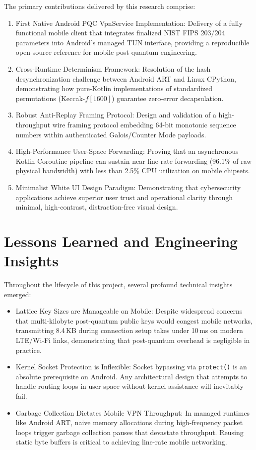 The primary contributions delivered by this research comprise:
\begin{enumerate}
    \item First Native Android PQC VpnService Implementation: Delivery of a fully functional mobile client that integrates finalized NIST FIPS 203/204 parameters into Android's managed TUN interface, providing a reproducible open-source reference for mobile post-quantum engineering.
    \item Cross-Runtime Determinism Framework: Resolution of the hash desynchronization challenge between Android ART and Linux CPython, demonstrating how pure-Kotlin implementations of standardized permutations (Keccak-$f[1600]$) guarantee zero-error decapsulation.
    \item Robust Anti-Replay Framing Protocol: Design and validation of a high-throughput wire framing protocol embedding 64-bit monotonic sequence numbers within authenticated Galois/Counter Mode payloads.
    \item High-Performance User-Space Forwarding: Proving that an asynchronous Kotlin Coroutine pipeline can sustain near line-rate forwarding (96.1\% of raw physical bandwidth) with less than 2.5\% CPU utilization on mobile chipsets.
    \item Minimalist White UI Design Paradigm: Demonstrating that cybersecurity applications achieve superior user trust and operational clarity through minimal, high-contrast, distraction-free visual design.
\end{enumerate}

\section{Lessons Learned and Engineering Insights}
\label{sec:lessons_learned}

Throughout the lifecycle of this project, several profound technical insights emerged:
\begin{itemize}
    \item Lattice Key Sizes are Manageable on Mobile: Despite widespread concerns that multi-kilobyte post-quantum public keys would congest mobile networks, transmitting 8.4\,KB during connection setup takes under 10\,ms on modern LTE/Wi-Fi links, demonstrating that post-quantum overhead is negligible in practice.
    \item Kernel Socket Protection is Inflexible: Socket bypassing via \texttt{protect()} is an absolute prerequisite on Android. Any architectural design that attempts to handle routing loops in user space without kernel assistance will inevitably fail.
    \item Garbage Collection Dictates Mobile VPN Throughput: In managed runtimes like Android ART, naive memory allocations during high-frequency packet loops trigger garbage collection pauses that devastate throughput. Reusing static byte buffers is critical to achieving line-rate mobile networking.
\end{itemize}

